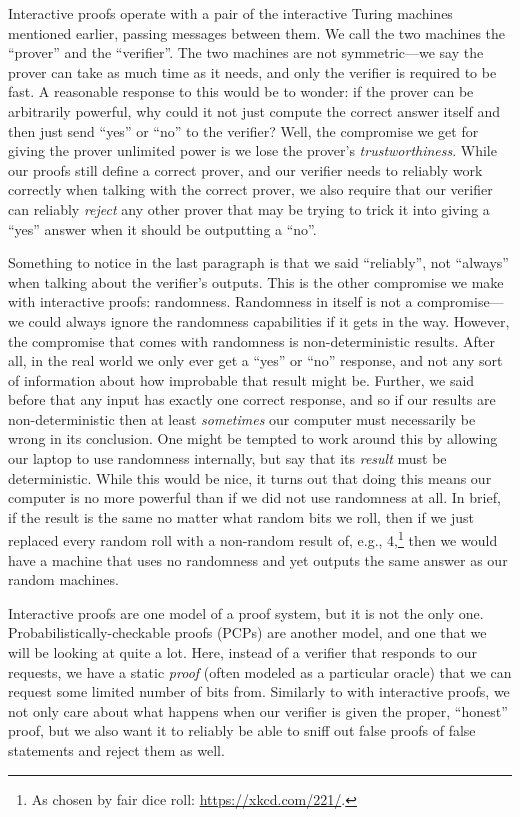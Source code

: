 \documentclass[english,12pt]{reedthesis}
\theoremstyle{plain}
\theoremstyle{definition}
\theoremstyle{remark}
\begin{document}
Interactive proofs operate with a pair of the interactive Turing machines
mentioned earlier, passing messages between them. We call the two machines the
``prover'' and the ``verifier''. The two machines are not symmetric---we say the
prover can take as much time as it needs, and only the verifier is required to
be fast. A reasonable response to this would be to wonder: if the prover can be
arbitrarily powerful, why could it not just compute the correct answer itself
and then just send ``yes'' or ``no'' to the verifier? Well, the compromise we
get for giving the prover unlimited power is we lose the prover's
\emph{trustworthiness}. While our proofs still define a correct prover, and our
verifier needs to reliably work correctly when talking with the correct prover,
we also require that our verifier can reliably \emph{reject} any other prover
that may be trying to trick it into giving a ``yes'' answer when it should be
outputting a ``no''.

Something to notice in the last paragraph is that we said ``reliably'', not
``always'' when talking about the verifier's outputs. This is the other
compromise we make with interactive proofs: randomness. Randomness in itself is
not a compromise---we could always ignore the randomness capabilities if it gets
in the way. However, the compromise that comes with randomness is
non-deterministic results. After all, in the real world we only ever get a
``yes'' or ``no'' response, and not any sort of information about how improbable
that result might be. Further, we said before that any input has exactly one
correct response, and so if our results are non-deterministic then at least
\emph{sometimes} our computer must necessarily be wrong in its conclusion. One
might be tempted to work around this by allowing our laptop to use randomness
internally, but say that its \emph{result} must be deterministic. While this
would be nice, it turns out that doing this means our computer is no more
powerful than if we did not use randomness at all. In brief, if the result is
the same no matter what random bits we roll, then if we just replaced every
random roll with a non-random result of, e.g., 4,\footnote{As chosen by fair
  dice roll: \url{https://xkcd.com/221/}.} then we would have a machine that
uses no randomness and yet outputs the same answer as our random machines.

Interactive proofs are one model of a proof system, but it is not the only one.
Probabilistically-checkable proofs (PCPs) are another model, and one that we
will be looking at quite a lot. Here, instead of a verifier that responds to our
requests, we have a static \emph{proof} (often modeled as a particular oracle)
that we can request some limited number of bits from. Similarly to with
interactive proofs, we not only care about what happens when our verifier is
given the proper, ``honest'' proof, but we also want it to reliably be able to
sniff out false proofs of false statements and reject them as well.
\end{document}

